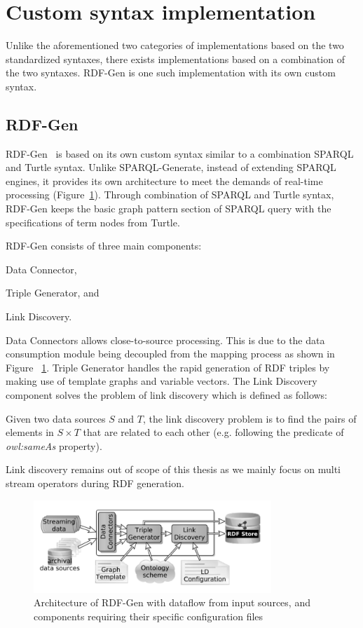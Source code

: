 \section{Custom syntax implementation}
Unlike the aforementioned two categories of implementations based on the two
standardized syntaxes, 
there exists implementations based on a combination of the two syntaxes. 
RDF-Gen is one such 
implementation with its own custom syntax. 

\subsection{RDF-Gen}
RDF-Gen~\cite{rdf_gen} is based on its own custom syntax 
similar to a combination SPARQL and Turtle syntax. 
Unlike SPARQL-Generate, instead of extending SPARQL engines, 
it provides its own architecture to meet the demands
of real-time processing (Figure~\ref{fig:rdf-gen-arch}). 
Through combination of SPARQL and Turtle syntax, RDF-Gen 
keeps the basic graph pattern section of SPARQL query with 
the specifications of term nodes from Turtle.

RDF-Gen consists of three main components: 
\begin{enumerate*}[label=(\alph*)]
  \item Data Connector,
  \item Triple Generator, and
  \item Link Discovery.
\end{enumerate*}

Data Connectors allows close-to-source processing. This is due to the
data consumption 
module being decoupled from the mapping process as shown in Figure ~\ref{fig:rdf-gen-arch}. 
Triple Generator handles the rapid generation of RDF triples by making use of 
template graphs and variable vectors. The Link Discovery component solves the 
problem of link discovery which is defined as follows:

\begin{defn}    
Given two data sources $S$ and $T$, the link discovery problem is to
find the pairs of elements in 
$S \times T$ that are related to each other (e.g. following the predicate of 
\emph{owl:sameAs} property). 
\end{defn}

Link discovery remains out of scope of this thesis as we mainly focus on 
multi stream operators during RDF generation.

\begin{figure}[!htbp]
  \centering
  \includegraphics[width=0.8\textwidth]{fig/rdf-gen-arch.png}
  \caption{Architecture of RDF-Gen with dataflow from input sources, and 
  components requiring their specific configuration files~\cite{rdf_gen}}
  \label{fig:rdf-gen-arch}
\end{figure}

